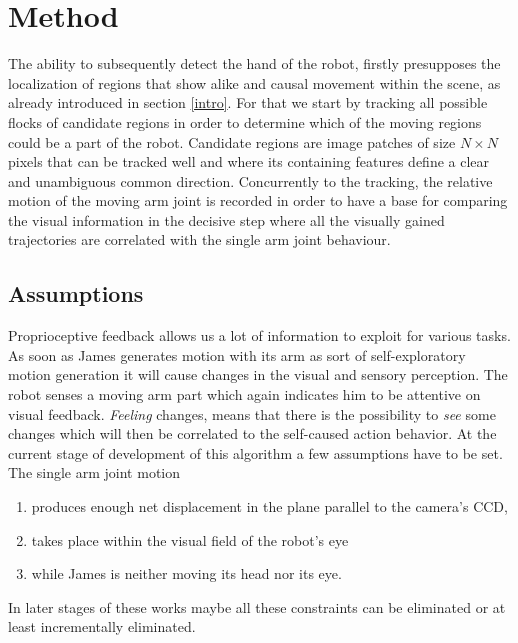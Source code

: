 \documentclass[conference]{IEEEtran}
\begin{document}
%
%





\section{Method}\label{method}
The ability to subsequently detect the hand of the robot, firstly presupposes the localization of regions that show alike and causal movement within the scene, as already introduced in section \ref{intro}. For that we start by tracking all possible flocks of candidate regions in order to determine which of the moving regions could be a part of the robot. Candidate regions are image patches of size $N \times N$ pixels that can be tracked well and where its containing features define a clear and unambiguous common direction. Concurrently to the tracking, the relative motion of the moving arm joint is recorded in order to have a base for comparing the visual information in the decisive step where all the visually gained trajectories are correlated with the single arm joint behaviour. 
%
%
%
%
\subsection{Assumptions}\label{method:localization:assumptions}
Proprioceptive feedback allows us a lot of information to exploit for various tasks. As soon as James generates motion with its arm as sort of self-exploratory motion generation it will cause changes in the visual and sensory perception. The robot senses a moving arm part which again indicates him to be attentive on visual feedback. \textit{Feeling} changes, means that there is the possibility to \textit{see} some changes which will then be correlated to the self-caused action behavior. At the current stage of development of this algorithm a few assumptions have to be set. The single arm joint motion
\begin{enumerate}
	\item produces enough net displacement in the plane parallel to the camera's CCD,
	\item takes place within the visual field of the robot's eye
	\item while James is neither moving its head nor its eye.
\end{enumerate}
In later stages of these works maybe all these constraints can be eliminated or at least incrementally eliminated.
\end{document}
